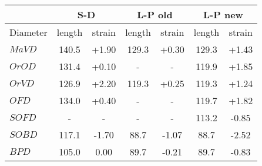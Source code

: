 \documentclass[a4paper, oneside, 11pt]{report}
\newcommand{\mi}{\mathit}
\begin{document}

\begin{algorithm}[th]
%	
%	
\end{algorithm}


\begin{table}[h]
\begin{center}
\begin{tabular}{|l|c|c||c|c||c|c|}\hline
& \multicolumn{2}{c||}{S-D} & \multicolumn{2}{c||}{L-P old} & \multicolumn{2}{c|}{L-P new} \\ \hline
Diameter & length & strain & length & strain & length & strain \\ \hline
$\mi{MaVD}$ & 140.5 & +1.90 & 129.3 & +0.30 & 129.3 & +1.43 \\
$\mi{OrOD}$ & 131.4 & +0.10 &   -   &  -    & 119.9 & +1.85 \\
$\mi{OrVD}$ & 126.9 & +2.20 & 119.3 & +0.25 & 119.3 & +1.24 \\
$\mi{OFD}$  & 134.0 & +0.40 &  -    &   -   & 119.7 & +1.82 \\ 
$\mi{SOFD}$ &  -    &   -   &  -    &   -   & 113.2 & -0.85 \\
$\mi{SOBD}$ & 117.1 & -1.70 &  88.7 & -1.07 &  88.7 & -2.52 \\
$\mi{BPD}$  & 105.0 &  0.00 &  89.7 & -0.21 &  89.7 & -0.83 \\ \hline
\end{tabular}
\end{center}
\end{table}
\end{document}

